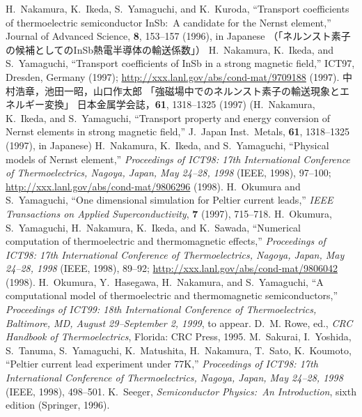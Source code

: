 \documentclass{jspf}            %
\begin{document}
\begin{thebibliography}{99}
  H.~Nakamura, K.~Ikeda, S.~Yamaguchi, and K.~Kuroda,
  ``Transport coefficients of thermoelectric semiconductor InSb:\
  A candidate for the Nernst element,''
  Journal of Advanced Science, \textbf{8}, 153--157 (1996),
  in Japanese
  （「ネルンスト素子の候補としてのInSb熱電半導体の輸送係数」）
  H.~Nakamura, K.~Ikeda, and S.~Yamaguchi,
  ``Transport coefficients of InSb in a strong magnetic field,''
  ICT97, Dresden, Germany (1997);
  \url{http://xxx.lanl.gov/abs/cond-mat/9709188} (1997).
  中村浩章，池田一昭，山口作太郎
  「強磁場中でのネルンスト素子の輸送現象とエネルギー変換」
  日本金属学会誌，\textbf{61}, 1318--1325 (1997)
  (H.~Nakamura, K.~Ikeda, and S.~Yamaguchi,
  ``Transport property and energy conversion of Nernst elements
  in strong magnetic field,''
  J.\ Japan Inst.\ Metals, \textbf{61}, 1318--1325 (1997), in Japanese)
\bibitem{Nakamura98}
  H.~Nakamura, K.~Ikeda, and S.~Yamaguchi,
  ``Physical models of Nernst element,''
  \textit{Proceedings of ICT98:
  17th International Conference of Thermoelectrics,
  Nagoya, Japan, May 24--28, 1998} (IEEE, 1998), 97--100;
  \url{http://xxx.lanl.gov/abs/cond-mat/9806296} (1998).
  H.~Okumura and S.~Yamaguchi,
  ``One dimensional simulation for Peltier current leads,''
  \textit{IEEE Transactions on Applied Superconductivity},
  \textbf{7} (1997), 715--718.
  H.~Okumura, S.~Yamaguchi, H.~Nakamura, K.~Ikeda, and K.~Sawada,
  ``Numerical computation of thermoelectric and thermomagnetic effects,''
  \textit{Proceedings of ICT98:
    17th International Conference of Thermoelectrics,
    Nagoya, Japan, May 24--28, 1998} (IEEE, 1998), 89--92;
  \url{http://xxx.lanl.gov/abs/cond-mat/9806042} (1998).
  H.~Okumura, Y.~Hasegawa, H.~Nakamura, and S.~Yamaguchi,
  ``A computational model of thermoelectric and thermomagnetic semiconductors,''
  \textit{Proceedings of ICT99:
    18th International Conference of Thermoelectrics,
    Baltimore, MD, August 29--September 2, 1999}, to appear.
  D.~M. Rowe, ed., \textit{CRC Handbook of Thermoelectrics},
  Florida: CRC Press, 1995.
  M.~Sakurai, I.~Yoshida, S.~Tanuma, S.~Yamaguchi,
  K.~Matushita, H.~Nakamura, T.~Sato, K.~Koumoto,
  ``Peltier current lead experiment under 77K,''
  \textit{Proceedings of ICT98:
  17th International Conference of Thermoelectrics,
  Nagoya, Japan, May 24--28, 1998} (IEEE, 1998), 498--501.
  K.~Seeger, \textit{Semiconductor Physics:\ An Introduction},
  sixth edition (Springer, 1996).

\end{thebibliography}
\end{document}
